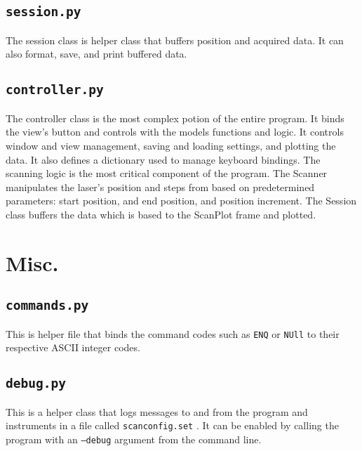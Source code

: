 \documentclass[11pt]{article}
\begin{document}
\subsection{\texttt{session.py}}
The session class is helper class that buffers position and acquired data. It can also format, save, and print buffered data.
\subsection{\texttt{controller.py}}
The controller class is the most complex potion of the entire program. It binds the view's button and controls with the models functions and logic. It  controls window and view management, saving and loading settings, and plotting the data. It also defines a dictionary used to manage keyboard bindings. 
The scanning logic is the most critical component of the program. The Scanner manipulates the laser's position and steps from based on predetermined parameters: start position, and end position, and position increment. The Session class buffers the data which is based to the ScanPlot frame and plotted.                                                                                                                                                              
\section{Misc.}
\subsection{\texttt{commands.py}}
This is helper file that binds the command codes such as \texttt{ENQ} or \texttt{NUll} to their respective ASCII integer codes.
\subsection{\texttt{debug.py}}
This is a helper class that logs messages to and from the program and instruments in a file called \texttt{scan\textunderscore config.set} . It can be enabled by calling the program with an \texttt{--debug} argument from the command line.
\end{document}
